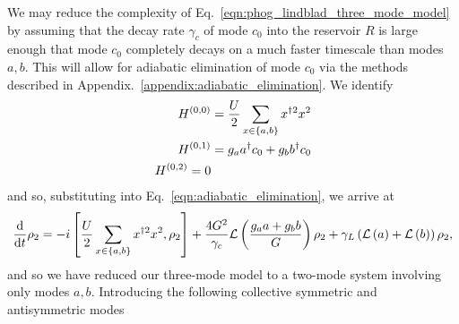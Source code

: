 We may reduce the complexity of Eq.~\ref{eqn:phog_lindblad_three_mode_model} by assuming that the decay rate $\gamma_c$ of mode $c_0$ into the reservoir $R$ is large enough that mode $c_0$ completely decays on a much faster timescale than modes $a, b$. This will allow for adiabatic elimination of mode $c_0$ via the methods described in Appendix.~\ref{appendix:adiabatic_elimination}. We identify
\begin{align}
H^{\left(0, 0\right)} &= \frac{U}{2} \sum_{x \in \left\{a, b\right\}} x^{\dagger 2} x^2 \notag \\
%
H^{\left(0, 1\right)} &= g_a a^\dagger c_0 + g_b b^\dagger c_0 \notag \\
%
H^{\left(0, 2\right)} = 0
\end{align}
and so, substituting into Eq.~\ref{eqn:adiabatic_elimination}, we arrive at
\begin{equation}\label{eqn:phog_two_mode_model_deriv}
\frac{\mathrm{d}}{\mathrm{d}t} \rho_2 = - i \left[\frac{U}{2} \sum_{x \in \left\{a, b\right\}} x^{\dagger 2} x^2, \rho_2\right] + \frac{4 G^2}{\gamma_c} \mathcal{L}\left(\frac{g_a a + g_b b}{G} \right)\rho_2 + \gamma_L \left(\mathcal{L}\left(a\right) + \mathcal{L}\left(b\right)\right)\rho_2,
\end{equation}
and so we have reduced our three-mode model to a two-mode system involving only modes $a, b$. Introducing the following collective symmetric and antisymmetric modes

